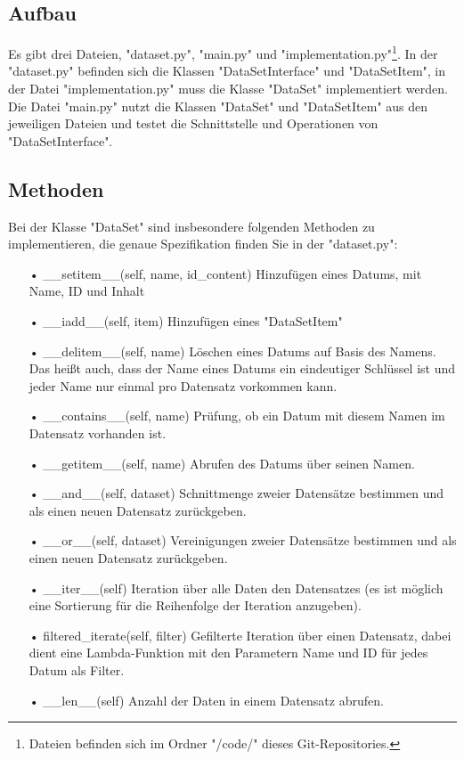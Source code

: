\documentclass[10pt, a4paper]{article}
\begin{document}
\subsection{Aufbau} 
Es gibt drei Dateien, "dataset.py", "main.py" und "implementation.py"\footnote{Dateien befinden sich im Ordner "/code/" dieses Git-Repositories.}.
In der "dataset.py" befinden sich die Klassen "DataSetInterface" und "DataSetItem",
in der Datei "implementation.py" muss die Klasse "DataSet" implementiert werden.
Die Datei "main.py" nutzt die Klassen "DataSet" und "DataSetItem" aus den jeweiligen Dateien und testet die Schnittstelle und Operationen von "DataSetInterface".

\subsection{Methoden} 
Bei der Klasse "DataSet" sind insbesondere folgenden Methoden zu implementieren, die genaue Spezifikation finden Sie in der "dataset.py":
\begin{enumerate}
\item[•] \_\_setitem\_\_(self, name, id\_content) Hinzufügen eines Datums, mit Name, ID und Inhalt

\item[•] \_\_iadd\_\_(self, item) Hinzufügen eines "DataSetItem"

\item[•] \_\_delitem\_\_(self, name) Löschen eines Datums auf Basis des Namens. Das heißt auch, dass der Name eines Datums ein eindeutiger Schlüssel ist und jeder Name nur einmal pro Datensatz vorkommen kann.

\item[•] \_\_contains\_\_(self, name) Prüfung, ob ein Datum mit diesem Namen im Datensatz vorhanden ist.

\item[•] \_\_getitem\_\_(self, name) Abrufen des Datums über seinen Namen.

\item[•] \_\_and\_\_(self, dataset) Schnittmenge zweier Datensätze bestimmen und als einen neuen Datensatz zurückgeben.

\item[•] \_\_or\_\_(self, dataset) Vereinigungen zweier Datensätze bestimmen und als einen neuen Datensatz zurückgeben.

\item[•] \_\_iter\_\_(self) Iteration über alle Daten den Datensatzes (es ist möglich eine Sortierung für die Reihenfolge der Iteration anzugeben).

\item[•] filtered\_iterate(self, filter) Gefilterte Iteration über einen Datensatz, dabei dient eine Lambda-Funktion mit den Parametern Name und ID für jedes Datum als Filter.

\item[•] \_\_len\_\_(self) Anzahl der Daten in einem Datensatz abrufen.
\end{enumerate}
\end{document}
